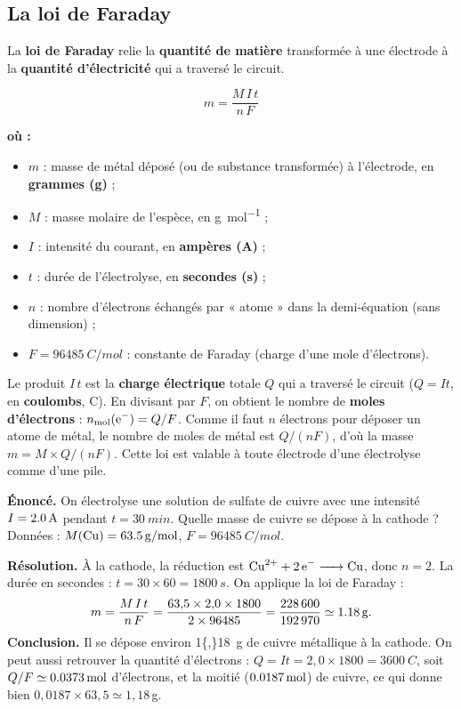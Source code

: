 \documentclass[11pt,a4paper]{article}
\newenvironment{ou}{%
  \par\smallskip\noindent\textbf{où :}\nopagebreak
  \begin{itemize}[leftmargin=1.8em,topsep=2pt,itemsep=1.5pt,parsep=0pt]}%
  {\end{itemize}}
\begin{document}
\subsection{La loi de Faraday}

La \textbf{loi de Faraday} relie la \textbf{quantité de matière} transformée à une électrode à la
\textbf{quantité d'électricité} qui a traversé le circuit.

\begin{formule}
\[
\boxed{\;m=\frac{M\,I\,t}{n\,F}\;}
\]
\begin{ou}
  \item $m$ : masse de métal déposé (ou de substance transformée) à l'électrode, en \textbf{grammes (g)} ;
  \item $M$ : masse molaire de l'espèce, en \si{g\per mol} ;
  \item $I$ : intensité du courant, en \textbf{ampères (A)} ;
  \item $t$ : durée de l'électrolyse, en \textbf{secondes (s)} ;
  \item $n$ : nombre d'électrons échangés par « atome » dans la demi-équation (sans dimension) ;
  \item $F=\SI{96485}{C\per mol}$ : constante de Faraday (charge d'une mole d'électrons).
\end{ou}
\end{formule}

\begin{remarque}
Le produit $I\,t$ est la \textbf{charge électrique} totale $Q$ qui a traversé le circuit
($Q=It$, en \textbf{coulombs}, C). En divisant par $F$, on obtient le nombre de
\textbf{moles d'électrons} : $n_{\mathrm{mol}}(\ce{e^-})=Q/F$. Comme il faut $n$ électrons pour
déposer un atome de métal, le nombre de moles de métal est
$Q/(nF)$, d'où la masse $m=M\times Q/(nF)$. Cette loi est valable à toute électrode d'une
électrolyse comme d'une pile.
\end{remarque}

\begin{exemple}
\textbf{Énoncé.} On électrolyse une solution de sulfate de cuivre  avec une intensité
$I=\SI{2{,}0}{A}$ pendant $t=\SI{30}{min}$. Quelle masse de cuivre se dépose à la cathode ?
Données : $M(\ce{Cu})=\SI{63{,}5}{g\per mol}$, $F=\SI{96485}{C\per mol}$.

\textbf{Résolution.} À la cathode, la réduction est $\ce{Cu^{2+} + 2 e^- -> Cu}$, donc $n=2$.
La durée en secondes : $t=30\times60=\SI{1800}{s}$. On applique la loi de Faraday :
\[
m=\frac{M\,I\,t}{n\,F}=\frac{63{,}5\times2{,}0\times1800}{2\times96485}
=\frac{228\,600}{192\,970}\simeq\SI{1{,}18}{g}.
\]
\textbf{Conclusion.} Il se dépose environ \SI{1{,}18}{g} de cuivre métallique à la cathode. On peut
aussi retrouver la quantité d'électrons : $Q=It=2{,}0\times1800=\SI{3600}{C}$, soit
$Q/F\simeq\SI{0{,}0373}{mol}$ d'électrons, et la moitié ($\SI{0{,}0187}{mol}$) de cuivre, ce qui
donne bien $0{,}0187\times63{,}5\simeq1{,}18$\,g.
\end{exemple}
\end{document}
